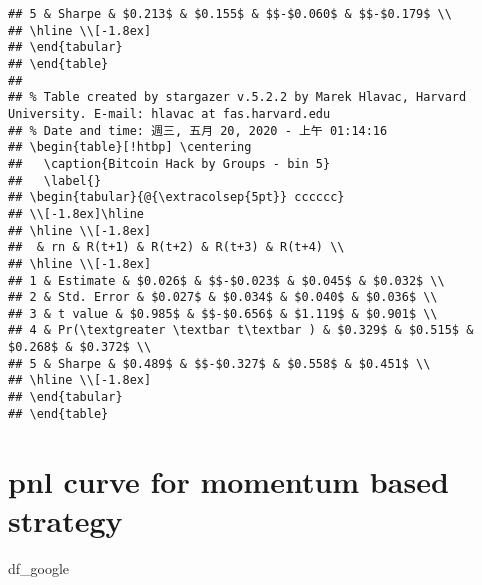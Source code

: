 \documentclass[
]{article}
\newenvironment{Shaded}{\begin{snugshade}}{\end{snugshade}}
\newcommand{\NormalTok}[1]{#1}
\begin{document}
\begin{verbatim}
## 5 & Sharpe & $0.213$ & $0.155$ & $$-$0.060$ & $$-$0.179$ \\ 
## \hline \\[-1.8ex] 
## \end{tabular} 
## \end{table} 
## 
## % Table created by stargazer v.5.2.2 by Marek Hlavac, Harvard University. E-mail: hlavac at fas.harvard.edu
## % Date and time: 週三, 五月 20, 2020 - 上午 01:14:16
## \begin{table}[!htbp] \centering 
##   \caption{Bitcoin Hack by Groups - bin 5} 
##   \label{} 
## \begin{tabular}{@{\extracolsep{5pt}} cccccc} 
## \\[-1.8ex]\hline 
## \hline \\[-1.8ex] 
##  & rn & R(t+1) & R(t+2) & R(t+3) & R(t+4) \\ 
## \hline \\[-1.8ex] 
## 1 & Estimate & $0.026$ & $$-$0.023$ & $0.045$ & $0.032$ \\ 
## 2 & Std. Error & $0.027$ & $0.034$ & $0.040$ & $0.036$ \\ 
## 3 & t value & $0.985$ & $$-$0.656$ & $1.119$ & $0.901$ \\ 
## 4 & Pr(\textgreater \textbar t\textbar ) & $0.329$ & $0.515$ & $0.268$ & $0.372$ \\ 
## 5 & Sharpe & $0.489$ & $$-$0.327$ & $0.558$ & $0.451$ \\ 
## \hline \\[-1.8ex] 
## \end{tabular} 
## \end{table}
\end{verbatim}

\hypertarget{pnl-curve-for-momentum-based-strategy}{%
\section{pnl curve for momentum based
strategy}\label{pnl-curve-for-momentum-based-strategy}}

\begin{Shaded}
\begin{Highlighting}[]
\NormalTok{df_google}
\end{Highlighting}
\end{Shaded}
\end{document}
